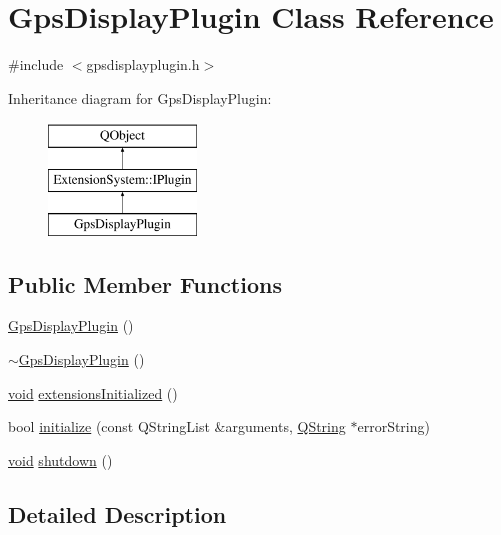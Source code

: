 \hypertarget{class_gps_display_plugin}{\section{Gps\-Display\-Plugin Class Reference}
\label{class_gps_display_plugin}
}


{\ttfamily \#include $<$gpsdisplayplugin.\-h$>$}

Inheritance diagram for Gps\-Display\-Plugin\-:\begin{figure}[H]
\begin{center}
\leavevmode
\includegraphics[height=3.000000cm]{class_gps_display_plugin}
\end{center}
\end{figure}
\subsection*{Public Member Functions}
\begin{DoxyCompactItemize}
\item 
\hyperlink{group___g_p_s_gadget_plugin_ga48d06ebeae3e8a6acb71c7a3c1e8c6c0}{Gps\-Display\-Plugin} ()
\item 
\hyperlink{group___g_p_s_gadget_plugin_gaa42f8ee4562f96fdd5e4c384bf7ca1d6}{$\sim$\-Gps\-Display\-Plugin} ()
\item 
\hyperlink{group___u_a_v_objects_plugin_ga444cf2ff3f0ecbe028adce838d373f5c}{void} \hyperlink{group___g_p_s_gadget_plugin_gad0d01fd7addd024c1a5fad7002a7c358}{extensions\-Initialized} ()
\item 
bool \hyperlink{group___g_p_s_gadget_plugin_ga481b9c74a2e46d2e461d472ac2e10c8f}{initialize} (const Q\-String\-List \&arguments, \hyperlink{group___u_a_v_objects_plugin_gab9d252f49c333c94a72f97ce3105a32d}{Q\-String} $\ast$error\-String)
\item 
\hyperlink{group___u_a_v_objects_plugin_ga444cf2ff3f0ecbe028adce838d373f5c}{void} \hyperlink{group___g_p_s_gadget_plugin_ga239f5aa443093c518b27a04e23d20b2e}{shutdown} ()
\end{DoxyCompactItemize}


\subsection{Detailed Description}


